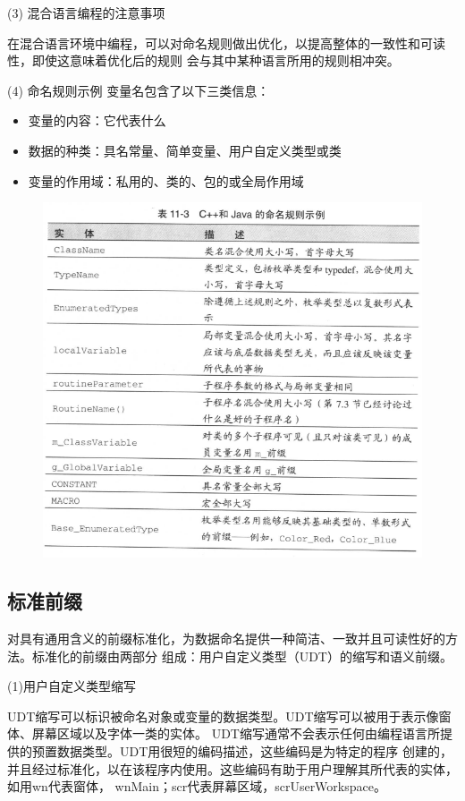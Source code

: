 \documentclass{article}
\begin{document}
\par
(3) 混合语言编程的注意事项
\par
在混合语言环境中编程，可以对命名规则做出优化，以提高整体的一致性和可读性，即使这意味着优化后的规则
会与其中某种语言所用的规则相冲突。

\par
(4) 命名规则示例
变量名包含了以下三类信息：
\begin{itemize}
    \item 变量的内容：它代表什么
    \item 数据的种类：具名常量、简单变量、用户自定义类型或类
    \item 变量的作用域：私用的、类的、包的或全局作用域
\end{itemize}
\begin{figure}[htb]
    \centering
    \includegraphics[width=15cm]{figure15.png}
\end{figure}

\subsection{标准前缀}
对具有通用含义的前缀标准化，为数据命名提供一种简洁、一致并且可读性好的方法。标准化的前缀由两部分
组成：用户自定义类型（UDT）的缩写和语义前缀。
\par
(1)用户自定义类型缩写
\par
UDT缩写可以标识被命名对象或变量的数据类型。UDT缩写可以被用于表示像窗体、屏幕区域以及字体一类的实体。
UDT缩写通常不会表示任何由编程语言所提供的预置数据类型。UDT用很短的编码描述，这些编码是为特定的程序
创建的，并且经过标准化，以在该程序内使用。这些编码有助于用户理解其所代表的实体，如用wn代表窗体，
wnMain；scr代表屏幕区域，scrUserWorkspace。
\end{document}
